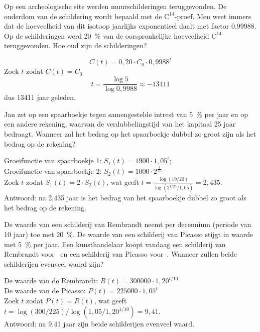 \begin{oef}
Op een archeologische site werden muurschilderingen
teruggevonden. De ouderdom van de schildering wordt bepaald
met de $\text{C}^{14}$-proef.  Men weet immers  dat de
hoeveelheid van dit isotoop jaarlijks exponentieel daalt met factor
\num{0.99988}. Op de schilderingen werd \SI{20}{\percent} van de
oorspronkelijke hoeveelheid $\text{C}^{14}$ teruggevonden. Hoe oud
zijn de schilderingen?
\begin{opl}
\[ C(t)=0,20\cdot C_0\cdot 0,9988^t \]
Zoek $t$ zodat $C(t)=C_0$\\
\[ t=\frac{\log5}{\log0,9988}\approx-13411\]
dus 13411 jaar geleden.
\end{opl}
\end{oef}

\begin{oef}
Jan zet  op een spaarboekje tegen samengestelde
intrest van \SI{5}{\percent} per jaar en  op een andere rekening,
waarvan de verdubbelingstijd van het kapitaal 25 jaar bedraagt.
Wanneer zal het bedrag op het spaarboekje dubbel zo
groot zijn als het bedrag op de rekening?
\begin{opl}
Groeifunctie van spaarboekje 1: $S_1(t)=1900\cdot 1,05^t$; \\Groeifunctie van spaarboekje 2: $S_2(t)=1000\cdot 2^\frac{t}{25}$\\
Zoek $t$ zodat $S_1(t)=2\cdot S_2(t)$, wat geeft $t=\frac{\log(19/20)}{\log(2^{1/25}/1,05)}=2,435$.\\
Antwoord: na 2,435 jaar is het bedrag van het spaarboekje dubbel zo groot als het bedrag op de rekening.
\end{opl}
\end{oef}

\begin{oef}
De waarde van een schilderij van Rembrandt neemt per
decennium (periode van 10 jaar) toe met \SI{20}{\percent}. De waarde van een schilderij
van Picasso stijgt in waarde met \SI{5}{\percent} per jaar. Een
kunsthandelaar koopt vandaag een schilderij van Rembrandt voor~
en een schilderij van Picasso voor~.
Wanneer zullen beide schilderijen evenveel waard zijn?
\begin{opl}
De waarde van de Rembrandt: $R(t)=300000\cdot 1,20^{t/10}$\\
De waarde van de Picasso: $P(t)=225000\cdot 1,05^t$\\
Zoek $t$ zodat $P(t)=R(t)$, wat geeft $t=\log(300/225)/\log(1,05/1,20^{1/10})=9,41$.\\
Antwoord: na 9,41 jaar zijn beide schilderijen evenveel waard.
\end{opl}
\end{oef}

